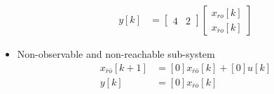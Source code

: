 \documentclass[twoside]{article}
\begin{document}
\begin{itemize}
\begin{align*}
        \\
        y[k] &= \left[ \begin{array}{c|c} 4 & 2 \end{array} \right] \begin{bmatrix} x_{ro}[k] \\ x_{\bar{r}o}[k] \end{bmatrix} 
    \end{align*}
    \item Non-observable and non-reachable sub-system
    \begin{align*}
        x_{\bar{r}\bar{o}}[k+1] &= [0] x_{\bar{r}\bar{o}}[k] + [0] u[k]
        \\
        y[k] &= [0] x_{\bar{r}\bar{o}}[k]
    \end{align*}
\end{itemize}




\end{document}
